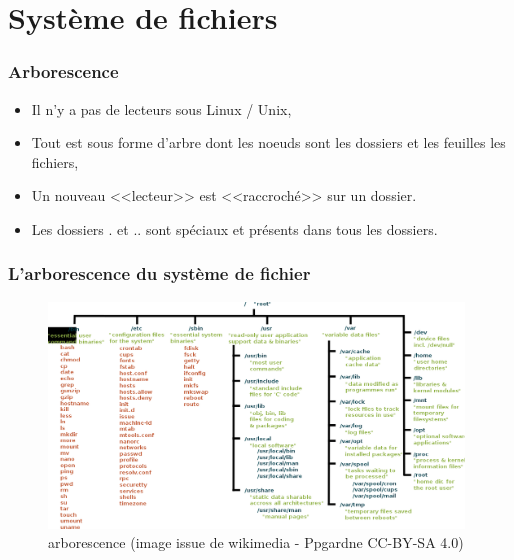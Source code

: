 \documentclass[handout,10pt]{beamer}
\begin{document}
\section{Système de fichiers}
\frame
{
    \frametitle{Arborescence}

    \begin{itemize}
        \item Il n'y a pas de lecteurs sous Linux / Unix,
        \item Tout est sous forme d'arbre dont les noeuds sont les dossiers et les feuilles les fichiers,
        \item Un nouveau <<lecteur>> est <<raccroché>> sur un dossier.
        \item Les dossiers {\ttfamily .} et {\ttfamily ..} sont spéciaux et présents dans tous les dossiers.
    \end{itemize}
}


\frame
{
    \frametitle{L'arborescence du système de fichier}

    \begin{center}

        \begin{figure}
            \includegraphics[height=6cm]{images/Standard-unix-filesystem-hierarchy.png}
            \caption{arborescence \tiny{(image issue de wikimedia - Ppgardne CC-BY-SA 4.0)}}
        \end{figure}

    \end{center}
}
\end{document}

